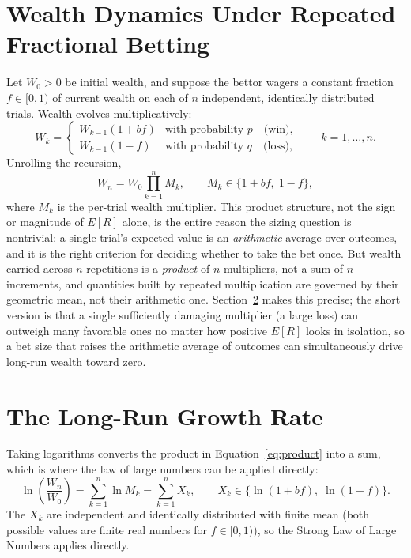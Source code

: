 \documentclass[11pt]{article}
\theoremstyle{remark}
\theoremstyle{definition}
\begin{document}
\section{Wealth Dynamics Under Repeated Fractional Betting}
\label{sec:dynamics}

Let $W_0>0$ be initial wealth, and suppose the bettor wagers a constant fraction $f\in[0,1)$ of current wealth on each of $n$ independent, identically distributed trials. Wealth evolves multiplicatively:
\begin{equation}
W_k =
\begin{cases}
W_{k-1}(1+bf) & \text{with probability } p \quad \text{(win)}, \\[2pt]
W_{k-1}(1-f) & \text{with probability } q \quad \text{(loss)},
\end{cases}
\qquad k=1,\dots,n.
\label{eq:recursion}
\end{equation}
Unrolling the recursion,
\begin{equation}
W_n = W_0 \prod_{k=1}^{n} M_k, \qquad M_k \in \{1+bf,\; 1-f\},
\label{eq:product}
\end{equation}
where $M_k$ is the per-trial wealth multiplier. This product structure, not the sign or magnitude of $E[R]$ alone, is the entire reason the sizing question is nontrivial: a single trial's expected value is an \emph{arithmetic} average over outcomes, and it is the right criterion for deciding whether to take the bet once. But wealth carried across $n$ repetitions is a \emph{product} of $n$ multipliers, not a sum of $n$ increments, and quantities built by repeated multiplication are governed by their geometric mean, not their arithmetic one. Section~\ref{sec:growth} makes this precise; the short version is that a single sufficiently damaging multiplier (a large loss) can outweigh many favorable ones no matter how positive $E[R]$ looks in isolation, so a bet size that raises the arithmetic average of outcomes can simultaneously drive long-run wealth toward zero.

\section{The Long-Run Growth Rate}
\label{sec:growth}

Taking logarithms converts the product in Equation~\eqref{eq:product} into a sum, which is where the law of large numbers can be applied directly:
\begin{equation}
\ln\!\left(\frac{W_n}{W_0}\right) = \sum_{k=1}^{n} \ln M_k = \sum_{k=1}^{n} X_k,
\qquad X_k \in \{\ln(1+bf),\; \ln(1-f)\}.
\label{eq:logsum}
\end{equation}
The $X_k$ are independent and identically distributed with finite mean (both possible values are finite real numbers for $f\in[0,1)$), so the Strong Law of Large Numbers applies directly.
\end{document}
